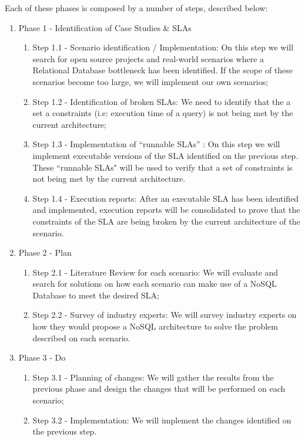 \documentclass{article}
\begin{document}
Each of these phases is composed by a number of steps, described below:
\begin{enumerate}
\item{Phase 1 - Identification of Case Studies \& SLAs }
\begin{enumerate}
\item {Step 1.1 - Scenario identification / Implementation: On this step we will search for open source projects and real-world scenarios where a Relational Database bottleneck has been identified. If the scope of these scenarios become too large, we will implement our own scenarios; }
\item {Step 1.2 - Identification of broken SLAs: We need to identify that the a set a constraints (i.e: execution time of a query) is not being met by the current architecture;}
\item {Step 1.3 - Implementation of ``runnable SLAs'' : On this step we will implement executable versions of the SLA identified on the previous step. These ``runnable SLAs" will be used to verify that a set of constraints is not being met by the current architecture. }
\item {Step 1.4 - Execution reports: After an executable SLA has been identified and implemented, execution reports will be consolidated to prove that the constraints of the SLA are being broken by the current architecture of the scenario.}

\end{enumerate}


\item{Phase 2 - Plan}
\begin{enumerate}
\item{Step 2.1 - Literature Review for each scenario: We will evaluate and search for solutions on how each scenario can make use of a NoSQL Database to meet the desired SLA; }
\item{Step 2.2 - Survey of industry experts: We will survey industry experts on how they would propose a NoSQL architecture to solve the problem described on each scenario. }
\end{enumerate}

\item{Phase 3 - Do}
\begin{enumerate}
\item{Step 3.1 - Planning of changes: We will gather the results from the previous phase and design the changes that will be performed on each scenario;}
\item{Step 3.2 - Implementation: We will implement the changes identified on the previous step. }
\end{enumerate}


\end{enumerate}
\end{document}
